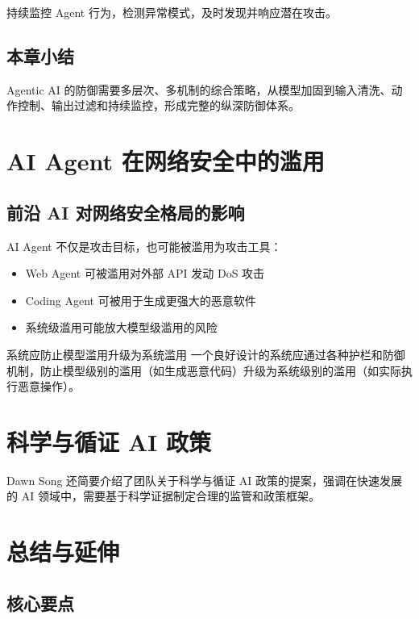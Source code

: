 \documentclass[a4paper]{article}
\begin{document}
持续监控 Agent 行为，检测异常模式，及时发现并响应潜在攻击。

\subsection{本章小结}

Agentic AI 的防御需要多层次、多机制的综合策略，从模型加固到输入清洗、动作控制、输出过滤和持续监控，形成完整的纵深防御体系。

\section{AI Agent 在网络安全中的滥用}

\subsection{前沿 AI 对网络安全格局的影响}

AI Agent 不仅是攻击目标，也可能被滥用为攻击工具：
\begin{itemize}
    \item Web Agent 可被滥用对外部 API 发动 DoS 攻击
    \item Coding Agent 可被用于生成更强大的恶意软件
    \item 系统级滥用可能放大模型级滥用的风险
\end{itemize}

\begin{warningbox}{系统应防止模型滥用升级为系统滥用}
一个良好设计的系统应通过各种护栏和防御机制，防止模型级别的滥用（如生成恶意代码）升级为系统级别的滥用（如实际执行恶意操作）。
\end{warningbox}

\section{科学与循证 AI 政策}

Dawn Song 还简要介绍了团队关于科学与循证 AI 政策的提案，强调在快速发展的 AI 领域中，需要基于科学证据制定合理的监管和政策框架。

\section{总结与延伸}

\subsection{核心要点}
\end{document}
